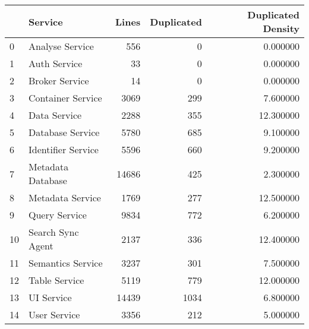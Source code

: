 \begin{tabular}{llrrr}
\toprule
 & Service & Lines & Duplicated & Duplicated Density \\
\midrule
0 & Analyse Service & 556 & 0 & 0.000000 \\
1 & Auth Service & 33 & 0 & 0.000000 \\
2 & Broker Service & 14 & 0 & 0.000000 \\
3 & Container Service & 3069 & 299 & 7.600000 \\
4 & Data Service & 2288 & 355 & 12.300000 \\
5 & Database Service & 5780 & 685 & 9.100000 \\
6 & Identifier Service & 5596 & 660 & 9.200000 \\
7 & Metadata Database & 14686 & 425 & 2.300000 \\
8 & Metadata Service & 1769 & 277 & 12.500000 \\
9 & Query Service & 9834 & 772 & 6.200000 \\
10 & Search Sync Agent & 2137 & 336 & 12.400000 \\
11 & Semantics Service & 3237 & 301 & 7.500000 \\
12 & Table Service & 5119 & 779 & 12.000000 \\
13 & UI Service & 14439 & 1034 & 6.800000 \\
14 & User Service & 3356 & 212 & 5.000000 \\
\bottomrule
\end{tabular}
